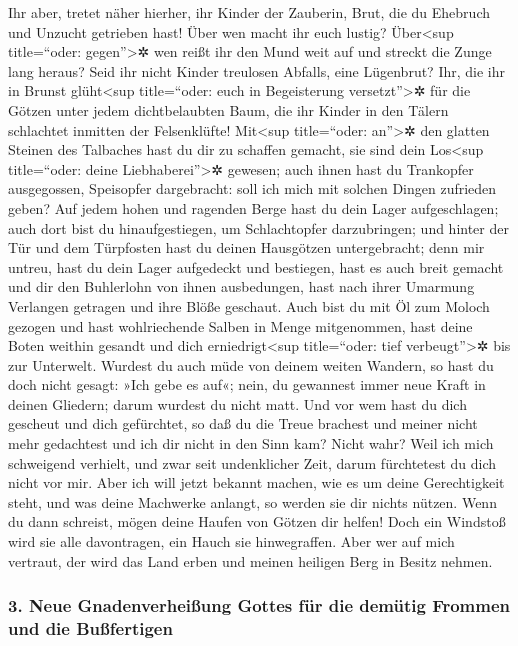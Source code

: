 Ihr aber, tretet näher hierher, ihr Kinder der Zauberin,
Brut, die du Ehebruch und Unzucht getrieben hast! Über wen
macht ihr euch lustig? Über\textless sup title=``oder:
gegen''\textgreater✲ wen reißt ihr den Mund weit auf und streckt die
Zunge lang heraus? Seid ihr nicht Kinder treulosen Abfalls, eine
Lügenbrut? Ihr, die ihr in Brunst glüht\textless sup
title=``oder: euch in Begeisterung versetzt''\textgreater✲ für die
Götzen unter jedem dichtbelaubten Baum, die ihr Kinder in den Tälern
schlachtet inmitten der Felsenklüfte! Mit\textless sup
title=``oder: an''\textgreater✲ den glatten Steinen des Talbaches hast
du dir zu schaffen gemacht, sie sind dein Los\textless sup title=``oder:
deine Liebhaberei''\textgreater✲ gewesen; auch ihnen hast du Trankopfer
ausgegossen, Speisopfer dargebracht: soll ich mich mit solchen Dingen
zufrieden geben? Auf jedem hohen und ragenden Berge hast
du dein Lager aufgeschlagen; auch dort bist du hinaufgestiegen, um
Schlachtopfer darzubringen; und hinter der Tür und dem
Türpfosten hast du deinen Hausgötzen untergebracht; denn mir untreu,
hast du dein Lager aufgedeckt und bestiegen, hast es auch breit gemacht
und dir den Buhlerlohn von ihnen ausbedungen, hast nach ihrer Umarmung
Verlangen getragen und ihre Blöße geschaut. Auch bist du
mit Öl zum Moloch gezogen und hast wohlriechende Salben in Menge
mitgenommen, hast deine Boten weithin gesandt und dich
erniedrigt\textless sup title=``oder: tief verbeugt''\textgreater✲ bis
zur Unterwelt. Wurdest du auch müde von deinem weiten
Wandern, so hast du doch nicht gesagt: »Ich gebe es auf«; nein, du
gewannest immer neue Kraft in deinen Gliedern; darum wurdest du nicht
matt. Und vor wem hast du dich gescheut und dich
gefürchtet, so daß du die Treue brachest und meiner nicht mehr
gedachtest und ich dir nicht in den Sinn kam? Nicht wahr? Weil ich mich
schweigend verhielt, und zwar seit undenklicher Zeit, darum fürchtetest
du dich nicht vor mir. Aber ich will jetzt bekannt
machen, wie es um deine Gerechtigkeit steht, und was deine Machwerke
anlangt, so werden sie dir nichts nützen. Wenn du dann
schreist, mögen deine Haufen von Götzen dir helfen! Doch ein Windstoß
wird sie alle davontragen, ein Hauch sie hinwegraffen. Aber wer auf mich
vertraut, der wird das Land erben und meinen heiligen Berg in Besitz
nehmen.

\hypertarget{neue-gnadenverheiuxdfung-gottes-fuxfcr-die-demuxfctig-frommen-und-die-buuxdffertigen}{%
\subsubsection{3. Neue Gnadenverheißung Gottes für die demütig Frommen
und die
Bußfertigen}\label{neue-gnadenverheiuxdfung-gottes-fuxfcr-die-demuxfctig-frommen-und-die-buuxdffertigen}}


